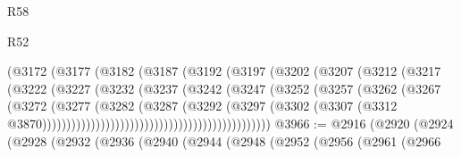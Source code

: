 \begin{lexlean}{R58}
\begin{lexlean}{R52}
\begin{coremodule}
{{{{{{{{{{{{{{{{{{{{{{{{{{{{{{{{{{{{{{{{{{{{{{{{{{{{{{{{{{{{{{{{{{{{{{{{{{{{{{{{{{{{{{{{{{{{{{{{{{{{{{{{{{{{{{{{{{{{{{{{{{{{{{{{{{{{{{{{{{{{{{{{{{{{{{{{{{{{{{{{{{{{{{{{{{{{{{{{{{{{{{{{{{{{{{{{{{{{{{                                        (@3172
                                          (@3177
                                            (@3182
                                              (@3187
                                                (@3192
                                                  (@3197
                                                    (@3202
                                                      (@3207
                                                        (@3212
                                                          (@3217
                                                            (@3222
                                                              (@3227
                                                                (@3232
                                                                  (@3237
                                                                    (@3242
                                                                      (@3247
                                                                        (@3252
                                                                          (@3257
                                                                            (@3262
                                                                              (@3267
                                                                                (@3272
                                                                                  (@3277
                                                                                    (@3282
                                                                                      (@3287
                                                                                        (@3292
                                                                                          (@3297
                                                                                            (@3302
                                                                                              (@3307
                                                                                                (@3312
                                                                                                  @3870)))))))))))))))))))))))))))))))))))))))))))))))
@3966 := @2916
    (@2920
      (@2924
        (@2928
          (@2932
            (@2936
              (@2940
                (@2944
                  (@2948
                    (@2952
                      (@2956
                        (@2961
                          (@2966
}}}}}}}}}}}}}}}}}}}}}}}}}}}}}}}}}}}}}}}}}}}}}}}}}}}}}}}}}}}}}}}}}}}}}}}}}}}}}}}}}}}}}}}}}}}}}}}}}}}}}}}}}}}}}}}}}}}}}}}}}}}}}}}}}}}}}}}}}}}}}}}}}}}}}}}}}}}}}}}}}}}}}}}}}}}}}}}}}}}}}}}}}}}}}}}}}}}}}}
\end{coremodule}
\end{lexlean}
\end{lexlean}
